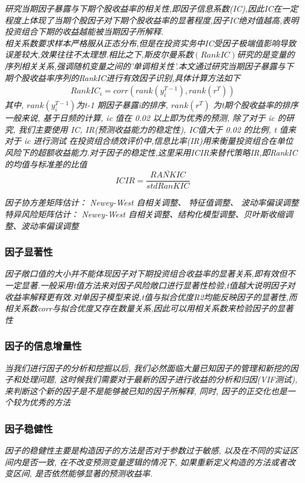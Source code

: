 \documentclass{scrartcl}
\numberwithin{equation}{section}   %
\begin{document}
\textsl{
    研究当期因子暴露与下期个股收益率的相关性,即因子信息系数(IC),因此IC在一定程度上体现了当期个股因子对下期个股收益率的显著程度,因子IC绝对值越高,表明投资组合下期的收益越能被当期因子所解释.\\
    相关系数要求样本严格服从正态分布,但是在投资实务中IC受因子极端值影响导致误差较大,效果往往不太理想.相比之下,斯皮尔曼系数$(RankIC)$研究的是变量的序列相关关系,强调随机变量之间的'单调相关性'.本文通过研究当期因子暴露与下期个股收益率序列的RankIC进行有效因子识别,具体计算方法如下}
\begin{equation}
    \begin{aligned}
        RankIC_i = corr(rank(y^{T-1}_i), rank(r^T))
    \end{aligned}
\end{equation}
\textsl{
    其中, $rank(y^{T-1}_i)$为t-1 期因子暴露i的排序, $ rank(r^T)$ 为t期个股收益率的排序
}
\textsl{一般来说, 基于日频的计算, ic 值在 0.02 以上即为优秀的预测, 除了对于 ic 的研究, 我们主要使用 IC, IR(预测收益能力的稳定性), IC值大于 0.02 的比例, t 值来对于 ic 进行测试}
\textsl{
    在投资组合绩效评价中,信息比率(IR)用来衡量投资组合在单位风险下的超额收益能力.对于因子的稳定性,这里采用ICIR来替代策略IR,即RankIC的均值与标准差的比值$$ICIR =\frac {\bar{RANKIC}}{std RanKIC}$$
}

\textsl{因子协方差矩阵估计： Newey-West 自相关调整、 特征值调整、 波动率偏误调整
    特异风险矩阵估计： Newey-West 自相关调整、结构化模型调整、贝叶斯收缩调整、波动率偏误调整
}

\subsubsection{因子显著性}
\textsl{
    因子敞口值的大小并不能体现因子对下期投资组合收益率的显著关系,即有效但不一定显著.一般采用t值方法来对因子风险敞口进行显著性检验,t值越大说明因子对收益率解释更有效.对单因子模型来说,t值与拟合优度R2均能反映因子的显著性,而相关系数corr与拟合优度又存在数量关系,因此可以用相关系数来检验因子的显著性}

\subsubsection{因子的信息增量性}
\textsl{
当我们进行因子的分析和挖掘以后, 我们必然面临大量已知因子的管理和新挖的因子和处理问题, 这时候我们需要对于最新的因子进行收益的分析和归因(VIF测试), 来判断这个新的因子是不是能够被已知的因子所解释, 同时, 因子的正交化也是一个较为优秀的方法
}
\subsubsection{因子稳健性}
\textsl{
    因子的稳健性主要是构造因子的方法是否对于参数过于敏感, 以及在不同的实证区间内是否一致, 在不改变预测变量逻辑的情况下, 如果重新定义构造的方法或者改变区间, 是否依然能够显著的预测收益率.
}
\end{document}
